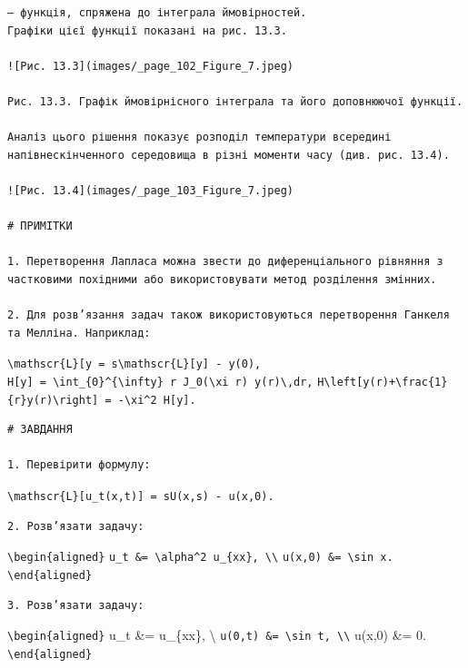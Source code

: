 \documentclass[
  ukrainian,
]{article}
\begin{document}
\begin{verbatim}
— функція, спряжена до інтеграла ймовірностей.
Графіки цієї функції показані на рис. 13.3.

![Рис. 13.3](images/_page_102_Figure_7.jpeg)

Рис. 13.3. Графік ймовірнісного інтеграла та його доповнюючої функції.

Аналіз цього рішення показує розподіл температури всередині напівнескінченного середовища в різні моменти часу (див. рис. 13.4).

![Рис. 13.4](images/_page_103_Figure_7.jpeg)

# ПРИМІТКИ

1. Перетворення Лапласа можна звести до диференціального рівняння з частковими похідними або використовувати метод розділення змінних.

2. Для розв’язання задач також використовуються перетворення Ганкеля та Мелліна. Наприклад:
\end{verbatim}

\texttt{\textbackslash{}mathscr\{L\}{[}y\textquotesingle{}{]}\ =\ s\textbackslash{}mathscr\{L\}{[}y{]}\ -\ y(0),}
\texttt{H{[}y{]}\ =\ \textbackslash{}int\_\{0\}\^{}\{\textbackslash{}infty\}\ r\ J\_0(\textbackslash{}xi\ r)\ y(r)\textbackslash{},dr,}
\texttt{H\textbackslash{}left{[}y\textquotesingle{}\textquotesingle{}(r)+\textbackslash{}frac\{1\}\{r\}y\textquotesingle{}(r)\textbackslash{}right{]}\ =\ -\textbackslash{}xi\^{}2\ H{[}y{]}.}

\begin{verbatim}
# ЗАВДАННЯ

1. Перевірити формулу:
\end{verbatim}

\texttt{\textbackslash{}mathscr\{L\}{[}u\_t(x,t){]}\ =\ sU(x,s)\ -\ u(x,0).}

\begin{verbatim}
2. Розв’язати задачу:
\end{verbatim}

\texttt{\textbackslash{}begin\{aligned\}}
\texttt{u\_t\ \&=\ \textbackslash{}alpha\^{}2\ u\_\{xx\},\ \textbackslash{}\textbackslash{}}
\texttt{u(x,0)\ \&=\ \textbackslash{}sin\ x.}
\texttt{\textbackslash{}end\{aligned\}}

\begin{verbatim}
3. Розв’язати задачу:
\end{verbatim}

\texttt{\textbackslash{}begin\{aligned\}} u\_t \&= u\_\{xx\},
\textbackslash{}
\texttt{u(0,t)\ \&=\ \textbackslash{}sin\ t,\ \textbackslash{}\textbackslash{}}
u(x,0) \&= 0. \texttt{\textbackslash{}end\{aligned\}}
\end{document}
